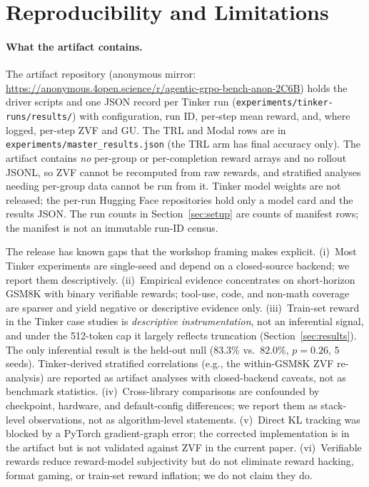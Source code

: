 \documentclass{article}
\begin{document}
\section{Reproducibility and Limitations}
\label{sec:limitations}

\paragraph{What the artifact contains.}
The artifact repository (anonymous mirror:
\url{https://anonymous.4open.science/r/agentic-grpo-bench-anon-2C6B})
holds the driver scripts and one JSON record per Tinker run
(\texttt{experiments/tinker-runs/results/}) with configuration, run ID,
per-step mean reward, and, where logged, per-step ZVF and GU. The TRL and
Modal rows are in \texttt{experiments/master\_results.json} (the TRL arm has
final accuracy only).
The artifact contains \emph{no} per-group or per-completion reward arrays
and no rollout JSONL, so ZVF cannot be recomputed from raw rewards, and
stratified analyses needing per-group data cannot be run from it. Tinker
model weights are not released; the per-run Hugging Face repositories hold
only a model card and the results JSON. The run counts in
Section~\ref{sec:setup} are counts of manifest rows; the manifest is not an
immutable run-ID census.

The release has known gaps that the workshop framing makes explicit. (i)~Most
Tinker experiments are single-seed and depend on a closed-source backend; we
report them descriptively. (ii)~Empirical evidence concentrates on
short-horizon GSM8K with binary verifiable rewards; tool-use, code, and
non-math coverage are sparser and yield negative or descriptive evidence
only. (iii)~Train-set reward in the Tinker case studies is \emph{descriptive
instrumentation}, not an inferential signal, and under the 512-token cap it
largely reflects truncation (Section~\ref{sec:results}). The only inferential
result is the held-out null ($83.3\%$ vs.\ $82.0\%$, $p{=}0.26$, 5 seeds).
Tinker-derived stratified correlations (e.g., the within-GSM8K ZVF
re-analysis) are reported as artifact analyses with closed-backend caveats,
not as benchmark statistics. (iv)~Cross-library comparisons are confounded by
checkpoint, hardware, and default-config differences; we report them as
stack-level observations, not as algorithm-level statements. (v)~Direct KL
tracking was blocked by a PyTorch gradient-graph error; the corrected
implementation is in the artifact but is not validated against ZVF in the
current paper. (vi)~Verifiable rewards reduce reward-model subjectivity but
do not eliminate reward hacking, format gaming, or train-set reward
inflation; we do not claim they do.
\end{document}
